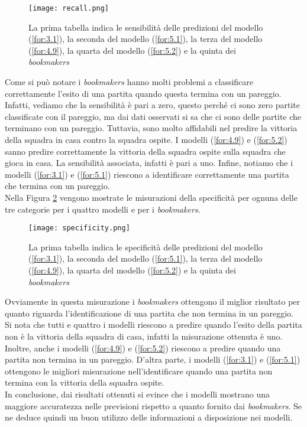 \begin{figure}[htbp]
	\begin{center}
		\texttt{[image: recall.png]}
		\caption{La prima tabella indica le sensibilità delle predizioni del modello (\ref{for:3.1}), la seconda del modello (\ref{for:5.1}), la terza del modello (\ref{for:4.9}), la quarta del modello (\ref{for:5.2}) e la quinta dei \emph{bookmakers}
			\label{fig:recall}}
	\end{center}
\end{figure}
Come si può notare i \emph{bookmakers} hanno molti problemi a classificare correttamente l'esito di una partita quando questa termina con un pareggio. Infatti, vediamo che la sensibilità è pari a zero, questo perché ci sono zero partite classificate con il pareggio, ma dai dati osservati si sa che ci sono delle partite che terminano con un pareggio. Tuttavia, sono molto affidabili nel predire la vittoria della squadra in casa contro la squadra ospite. I modelli (\ref{for:4.9}) e (\ref{for:5.2}) sanno predire correttamente la vittoria della squadra ospite sulla squadra che gioca in casa. La sensibilità associata, infatti è pari a uno. Infine, notiamo che i modelli (\ref{for:3.1}) e (\ref{for:5.1}) riescono a identificare correttamente una partita che termina con un pareggio.\\
Nella Figura \ref{fig:speci} vengono mostrate le misurazioni della specificità per ognuna delle tre categorie per i quattro modelli e per i \emph{bookmakers}.

\begin{figure}[htbp]
	\begin{center}
		\texttt{[image: specificity.png]}
		\caption{La prima tabella indica le specificità delle predizioni del modello (\ref{for:3.1}), la seconda del modello (\ref{for:5.1}), la terza del modello (\ref{for:4.9}), la quarta del modello (\ref{for:5.2}) e la quinta dei \emph{bookmakers}
			\label{fig:speci}}
	\end{center}
\end{figure}
Ovviamente in questa misurazione i \emph{bookmakers} ottengono il miglior risultato per quanto riguarda l'identificazione di una partita che non termina in un pareggio. Si nota che tutti e quattro i modelli riescono a predire quando l'esito della partita non è la vittoria della squadra di casa, infatti la misurazione ottenuta è uno. Inoltre, anche i modelli (\ref{for:4.9}) e (\ref{for:5.2}) riescono a predire quando una partita non termina in un pareggio. D’altra parte, i modelli (\ref{for:3.1}) e (\ref{for:5.1}) ottengono le migliori misurazione nell'identificare quando una partita non termina con la vittoria della squadra ospite.\\

In conclusione, dai risultati ottenuti si evince che i modelli mostrano una maggiore accuratezza nelle previsioni rispetto a quanto fornito dai \emph{bookmakers}. Se ne deduce quindi un buon utilizzo delle informazioni a disposizione nei modelli.


